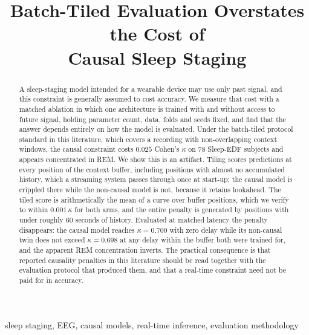 \documentclass[conference]{IEEEtran}
\begin{document}
\title{Batch-Tiled Evaluation Overstates the Cost of\\Causal Sleep Staging}

\author{
}

\maketitle

\begin{abstract}
A sleep-staging model intended for a wearable device may use only past signal, and this
constraint is generally assumed to cost accuracy. We measure that cost with a matched
ablation in which one architecture is trained with and without access to future signal,
holding parameter count, data, folds and seeds fixed, and find that the answer depends
entirely on how the model is evaluated. Under the batch-tiled protocol standard in this
literature, which covers a recording with non-overlapping context windows, the causal
constraint costs $0.025$ Cohen's $\kappa$ on 78 Sleep-EDF subjects and appears concentrated
in REM. We show this is an artifact. Tiling scores predictions at every position of the
context buffer, including positions with almost no accumulated history, which a streaming
system passes through once at start-up; the causal model is crippled there while the
non-causal model is not, because it retains lookahead. The tiled score is arithmetically the
mean of a curve over buffer positions, which we verify to within $0.001\,\kappa$ for both
arms, and the entire penalty is generated by positions with under roughly 60 seconds of
history. Evaluated at matched latency the penalty disappears: the causal model reaches
$\kappa = 0.700$ with zero delay while its non-causal twin does not exceed $\kappa = 0.698$
at any delay within the buffer both were trained for, and the apparent REM concentration
inverts. The practical consequence is that reported causality penalties in this literature
should be read together with the evaluation protocol that produced them, and that a
real-time constraint need not be paid for in accuracy.
\end{abstract}

\begin{IEEEkeywords}
sleep staging, EEG, causal models, real-time inference, evaluation methodology
\end{IEEEkeywords}
\end{document}
